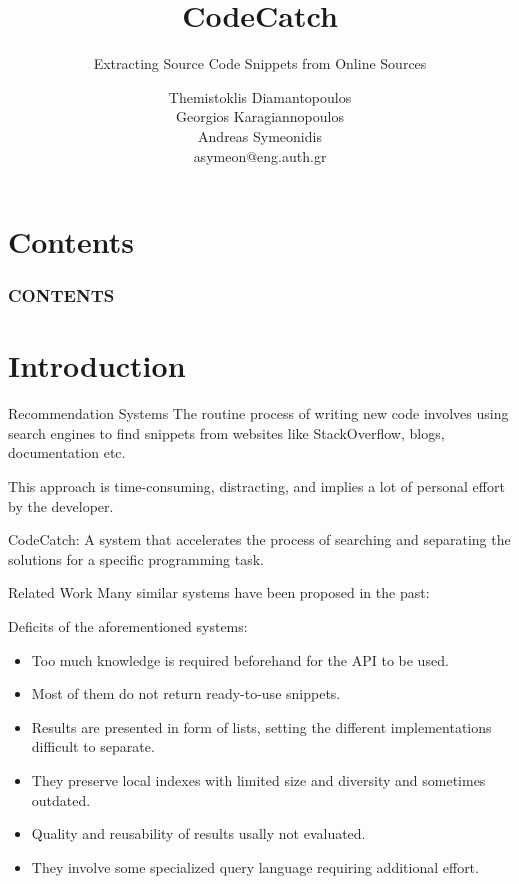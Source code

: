 \documentclass[compress]{beamer}
\title{CodeCatch}
\subtitle{Extracting Source Code Snippets from Online Sources}
\author{Themistoklis Diamantopoulos\\ Georgios Karagiannopoulos\\ Andreas Symeonidis\\ {\small asymeon@eng.auth.gr
}}
\institute{Electrical \& Computer Engineering Dept.\\ Aristotle University of Thessaloniki}
\begin{document}
\maketitle

\section*{Contents}
\begin{frame}
	\frametitle{CONTENTS}
	\tableofcontents[hideallsubsections]
\end{frame}

\section{Introduction}

\begin{frame}{Recommendation Systems}
The routine process of writing new code involves using search engines to find {\Medium snippets} from websites like StackOverflow, blogs, documentation etc.

\vfill
This approach is time-consuming, distracting, and implies a lot of personal effort by the developer.

\vfill
{\Medium CodeCatch}: A system that accelerates the process of searching and separating the solutions for a specific programming task.


\end{frame}

\begin{frame}{Related Work}
Many similar systems have been proposed in the past:


\alert{Deficits} of the aforementioned systems:

\begin{itemize}
	\item Too much knowledge is required beforehand for the API to be used.
	\item Most of them do not return ready-to-use snippets.
	\item Results are presented in form of lists, setting the different implementations difficult to separate.
	\item They preserve local indexes with limited size and diversity and sometimes outdated.
	\item Quality and reusability of results usally not evaluated.
	\item They involve some specialized query language requiring additional effort.
\end{itemize}

\end{frame}
\end{document}
